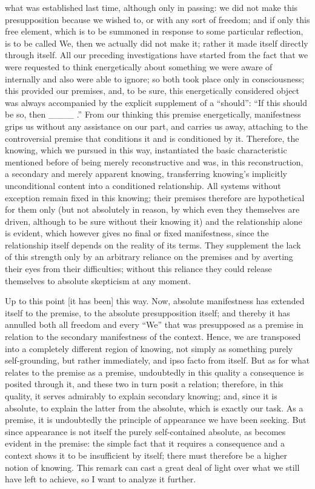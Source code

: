 what was established last time,
although only in passing:
we did not make this presupposition
because we wished to,
or with any sort of freedom;
and if only this free element,
which is to be summoned in response to
some particular reflection,
is to be called We,
then we actually did not make it;
rather it made itself directly through itself.
All our preceding investigations have started from
the fact that we were requested to think energetically
about something we were aware of internally and
also were able to ignore;
so both took place only in consciousness;
this provided our premises, and, to be sure,
this energetically considered object was always
accompanied by the explicit supplement of a “should”:
“If this should be so, then ____ .”
From our thinking this premise energetically,
manifestness grips us without any assistance on our part,
and carries us away, attaching to the controversial premise
that conditions it and is conditioned by it.
Therefore, the knowing, which we pursued in this way,
instantiated the basic characteristic mentioned before
of being merely reconstructive
and was, in this reconstruction,
a secondary and merely apparent knowing,
transferring knowing's implicitly unconditional content
into a conditioned relationship.
All systems without exception remain fixed in this knowing;
their premises therefore are hypothetical for them only
(but not absolutely in reason,
by which even they themselves are driven,
although to be sure without their knowing it)
and the relationship alone is evident,
which however gives no final or fixed manifestness,
since the relationship itself depends on
the reality of its terms.
They supplement the lack of this strength
only by an arbitrary reliance on the premises
and by averting their eyes from their difficulties;
without this reliance they could release themselves
to absolute skepticism at any moment.

Up to this point [it has been] this way.
Now, absolute manifestness has extended itself to the premise,
to the absolute presupposition itself;
and thereby it has annulled both all freedom
and every “We” that was presupposed as a premise
in relation to the secondary manifestness of the context.
Hence, we are transposed into a
completely different region of knowing,
not simply as something purely self-grounding,
but rather immediately, and ipso facto from itself.
But as for what relates to the premise as a premise,
undoubtedly in this quality a consequence is posited through it,
and these two in turn posit a relation;
therefore, in this quality,
it serves admirably to
explain secondary knowing;
and, since it is absolute,
to explain the latter from the absolute,
which is exactly our task.
As a premise, it is undoubtedly
the principle of appearance we have been seeking.
But since appearance is not itself
the purely self-contained absolute,
as becomes evident in the premise:
the simple fact that it requires
a consequence and a context
shows it to be insufficient by itself;
there must therefore be a higher notion of knowing.
This remark can cast a great deal of light
over what we still have left to achieve,
so I want to analyze it further.

